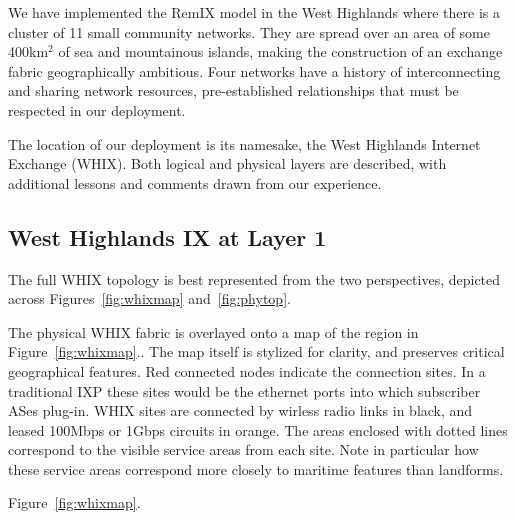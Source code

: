 
We have implemented the RemIX model in the West Highlands where there
is a cluster of
11 small community networks. They are spread over an area of some 400km$^2$
 of sea and mountainous islands, making the
construction of an exchange fabric geographically ambitious. Four networks have
a history of interconnecting and sharing network resources, pre-established
relationships that must be respected in our deployment.

The location of our deployment is its namesake, the West Highlands Internet
Exchange (WHIX). Both logical and physical layers are described, with
additional lessons and comments drawn from our experience.



\subsection{West Highlands IX at Layer 1}

The full WHIX topology is best represented from the two perspectives, depicted
across Figures~\ref{fig:whixmap} and~\ref{fig:phytop}.

The physical WHIX fabric is overlayed onto a map of the region in
Figure~\ref{fig:whixmap}.. The map itself is stylized for clarity, and preserves
critical geographical features. Red connected nodes indicate the connection
sites. In a traditional IXP these sites would be the ethernet ports into which
subscriber ASes plug-in. WHIX sites are connected by wirless radio links in
black, and leased 100Mbps or 1Gbps circuits in orange. The areas enclosed with
dotted lines correspond to the visible service areas from each site.
 Note in particular how these service areas
correspond more  closely to maritime features than landforms.

Figure~\ref{fig:whixmap}.
\begin{figure*}
  \subfloat[Physical topology of the \ac{WHIX} switching fabric.]{
  \resizebox{!}{0.5\textheight}{
    \begin{tikzpicture}
      \whixphysicaldiagram
    \end{tikzpicture}
  \label{fig:whixmap}
  }
  \subfloat[\ac{WHIX} connections to subscriber networks; dashed lines correspond to layer-2 circuits forming the logical \ac{WHIX} switching fabric.]{
  \resizebox{!}{0.5\textheight}{
    \begin{tikzpicture}
      \whixmeshdiagram
    \end{tikzpicture}
  }
  \label{fig:phytop}
\end{figure*}

